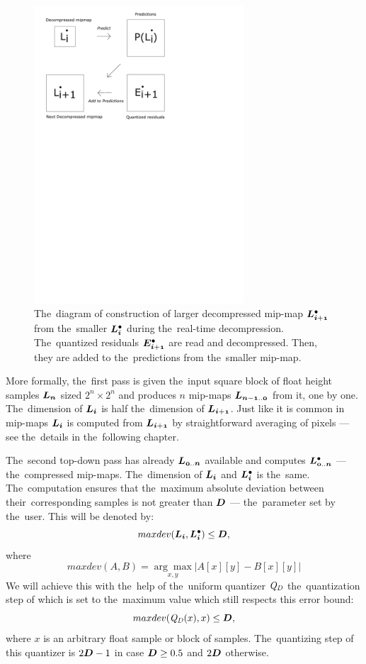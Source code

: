 \begin{figure}
	\includegraphics[trim={1cm 18cm 7cm 0cm}, clip, width=0.7\textwidth]{figures/single_decomp.pdf}\centering
	\caption{The~diagram of construction of larger decompressed mip-map $\ldot{i+1}$ from the~smaller $\ldot{i}$ during the~real-time decompression. The~quantized residuals $\objdot{E}{i+1}$ are read and decompressed. Then, they are added to the~predictions from the~smaller mip-map.}
	\label{fig:single_decomp}
\end{figure}

More formally, the~first pass is given the~input square block of float height samples $\lnorm{n}$ sized $2^n \times 2^n$ and produces $n$ mip-maps $\lnorm{n-1..0}$ from it, one by one. The~dimension of $\lnorm{i}$ is half the~dimension of $\lnorm{i+1}$. Just like it is common in mip-maps $\lnorm{i}$ is computed from $\lnorm{i+1}$ by straightforward averaging of pixels --- see the~details in the~following chapter. 

The~second top-down pass has already $\lnorm{0..n}$ available and computes $\ldot{0..n}$ --- the~compressed mip-maps. The~dimension of $\lnorm{i}$ and $\ldot{i}$ is the~same. The~computation ensures that the~maximum absolute deviation between their~corresponding samples is not greater than $\objnorm{D}{}$ --- the~parameter set by the~user. This will be denoted by:
$$maxdev(\lnorm{i}, \ldot{i}) \leq \objnorm{D}{},$$
where
$$maxdev(A, B) = \underset{x, y}{\arg\max}|A[x][y] - B[x][y]|$$
We will achieve this with the~help of the~uniform quantizer $\mathit{Q_{D}}$ the~quantization step of which is set to the~maximum value which still respects this error bound:
$$maxdev(\dnorm(x), x) \leq \objnorm{D}{},$$
where $x$ is an arbitrary float sample or block of samples.
The~quantizing step of this quantizer is $2\objnorm{D}{} - 1$ in case $\objnorm{D}{} \geq 0.5$ and $2\objnorm{D}{}$ otherwise.


